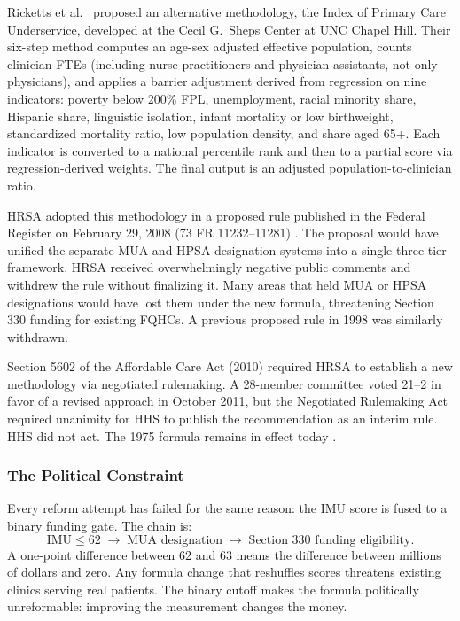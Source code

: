 \documentclass[11pt]{article}
\begin{document}
Ricketts et al.\ \cite{ricketts2007designating} proposed an alternative
methodology, the Index of Primary Care Underservice, developed at the Cecil G.\
Sheps Center at UNC Chapel Hill. Their six-step method computes an age-sex
adjusted effective population, counts clinician FTEs (including nurse
practitioners and physician assistants, not only physicians), and applies a
barrier adjustment derived from regression on nine indicators: poverty below
200\% FPL, unemployment, racial minority share, Hispanic share, linguistic
isolation, infant mortality or low birthweight, standardized mortality ratio,
low population density, and share aged 65+. Each indicator is converted to
a national percentile rank and then to a partial score via regression-derived
weights. The final output is an adjusted population-to-clinician ratio.

HRSA adopted this methodology in a proposed rule published in the Federal
Register on February 29, 2008 (73 FR 11232--11281)
\cite{HRSA2008proposed}. The proposal would have unified the separate MUA
and HPSA designation systems into a single three-tier framework. HRSA
received overwhelmingly negative public comments and withdrew the rule
without finalizing it. Many areas that held MUA or HPSA designations would
have lost them under the new formula, threatening Section 330 funding for
existing FQHCs. A previous proposed rule in 1998 was similarly withdrawn.

Section 5602 of the Affordable Care Act (2010) required HRSA to establish a
new methodology via negotiated rulemaking. A 28-member committee voted 21--2
in favor of a revised approach in October 2011, but the Negotiated Rulemaking
Act required unanimity for HHS to publish the recommendation as an interim
rule. HHS did not act. The 1975 formula remains in effect today
\cite{HRSA2008proposed}.


\subsubsection{The Political Constraint}\label{sec:imu-political}

Every reform attempt has failed for the same reason: the IMU score is fused
to a binary funding gate. The chain is:
\[
\text{IMU} \leq 62 \;\longrightarrow\; \text{MUA designation}
\;\longrightarrow\; \text{Section 330 funding eligibility.}
\]
A one-point difference between 62 and 63 means the difference between
millions of dollars and zero. Any formula change that reshuffles scores
threatens existing clinics serving real patients. The binary cutoff makes the
formula politically unreformable: improving the measurement changes the money.
\end{document}
